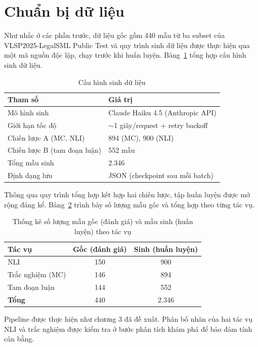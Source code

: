 \section{Chuẩn bị dữ liệu}

Như nhắc ở các phần trước, dữ liệu gốc gồm 440 mẫu từ ba subset của VLSP2025-LegalSML Public Test và quy trình sinh dữ liệu được thực hiện qua một mã nguồn độc lập, chạy trước khi huấn luyện. Bảng~\ref{tab:datagen} tổng hợp cấu hình sinh dữ liệu.

\begin{table}[ht]
\centering
\begin{tabular}{ll}
\toprule
\textbf{Tham số} & \textbf{Giá trị} \\
\midrule
Mô hình sinh & Claude Haiku 4.5 (Anthropic API) \\
Giới hạn tốc độ & $\sim$1 giây/request + retry backoff \\
Chiến lược A (MC, NLI) & 894 (MC), 900 (NLI) \\
Chiến lược B (tam đoạn luận) & 552 mẫu \\
Tổng mẫu sinh & 2.346 \\
Định dạng lưu & JSON (checkpoint sau mỗi batch) \\
\bottomrule
\end{tabular}
\caption{Cấu hình sinh dữ liệu}
\label{tab:datagen}
\end{table}

Thông qua quy trình tổng hợp kết hợp hai chiến lược, tập huấn luyện được mở rộng đáng kể. Bảng~\ref{tab:data} trình bày số lượng mẫu gốc và tổng hợp theo từng tác vụ.

\begin{table}[ht]
\centering
\begin{tabular}{lcc}
\toprule
\textbf{Tác vụ} & \textbf{Gốc (đánh giá)} & \textbf{Sinh (huấn luyện)} \\
\midrule
NLI         & 150 & 900 \\
Trắc nghiệm (MC) & 146 & 894 \\
Tam đoạn luận    & 144 & 552 \\
\midrule
\textbf{Tổng} & 440 & 2.346 \\
\bottomrule
\end{tabular}
\caption{Thống kê số lượng mẫu gốc (đánh giá) và mẫu sinh (huấn luyện) theo tác vụ}
\label{tab:data}
\end{table}

Pipeline được thực hiện như chương 3 đã đề xuất. Phân bố nhãn của hai tác vụ NLI và trắc nghiệm được kiểm tra ở bước phân tích khám phá để bảo đảm tính cân bằng.

